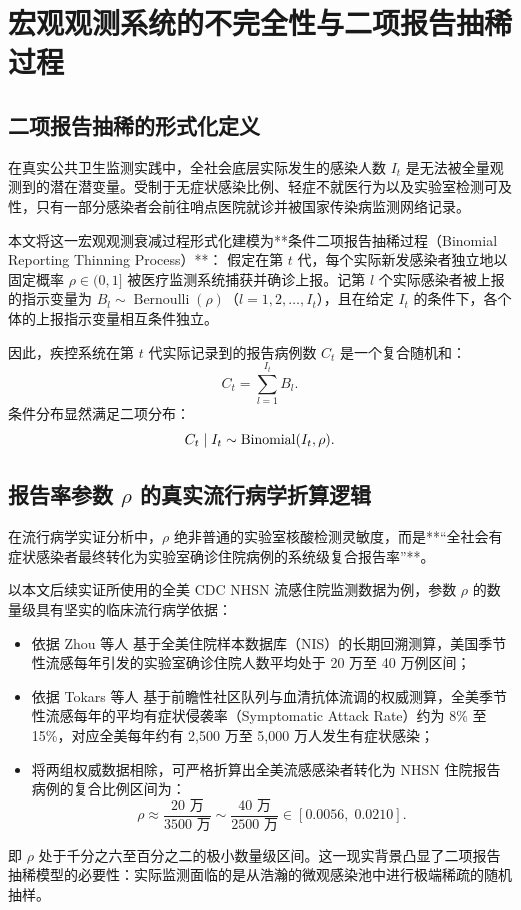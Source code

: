 \section{宏观观测系统的不完全性与二项报告抽稀过程}\label{sec:thinning}

\subsection{二项报告抽稀的形式化定义}
在真实公共卫生监测实践中，全社会底层实际发生的感染人数 $I_t$ 是无法被全量观测到的潜在潜变量。受制于无症状感染比例、轻症不就医行为以及实验室检测可及性，只有一部分感染者会前往哨点医院就诊并被国家传染病监测网络记录。

本文将这一宏观观测衰减过程形式化建模为**条件二项报告抽稀过程（Binomial Reporting Thinning Process）**：
假定在第 $t$ 代，每个实际新发感染者独立地以固定概率 $\rho \in (0, 1]$ 被医疗监测系统捕获并确诊上报。记第 $l$ 个实际感染者被上报的指示变量为 $B_l \sim \operatorname{Bernoulli}(\rho)$（$l = 1, 2, \dots, I_t$），且在给定 $I_t$ 的条件下，各个体的上报指示变量相互条件独立。

因此，疾控系统在第 $t$ 代实际记录到的报告病例数 $C_t$ 是一个复合随机和：
\begin{equation}
C_t = \sum_{l=1}^{I_t} B_l. \label{eq:binomial_thinning_sum}
\end{equation}
条件分布显然满足二项分布：
\begin{equation}
C_t \mid I_t \sim \operatorname{Binomial}(I_t, \rho).
\end{equation}

\subsection{报告率参数 $\rho$ 的真实流行病学折算逻辑}
在流行病学实证分析中，$\rho$ 绝非普通的实验室核酸检测灵敏度，而是**“全社会有症状感染者最终转化为实验室确诊住院病例的系统级复合报告率”**。

以本文后续实证所使用的全美 CDC NHSN 流感住院监测数据为例，参数 $\rho$ 的数量级具有坚实的临床流行病学依据：
\begin{itemize}
    \item 依据 Zhou 等人 \citep{zhou2012hospitalizations} 基于全美住院样本数据库（NIS）的长期回溯测算，美国季节性流感每年引发的实验室确诊住院人数平均处于 20 万至 40 万例区间；
    \item 依据 Tokars 等人 \citep{tokars2018seasonal} 基于前瞻性社区队列与血清抗体流调的权威测算，全美季节性流感每年的平均有症状侵袭率（Symptomatic Attack Rate）约为 8\% 至 15\%，对应全美每年约有 2,500 万至 5,000 万人发生有症状感染；
    \item 将两组权威数据相除，可严格折算出全美流感感染者转化为 NHSN 住院报告病例的复合比例区间为：
    \begin{equation}
    \rho \approx \frac{20\text{ 万}}{3500\text{ 万}} \sim \frac{40\text{ 万}}{2500\text{ 万}} \in [0.0056, \; 0.0210]. \label{eq:rho_range}
    \end{equation}
\end{itemize}
即 $\rho$ 处于千分之六至百分之二的极小数量级区间。这一现实背景凸显了二项报告抽稀模型的必要性：实际监测面临的是从浩瀚的微观感染池中进行极端稀疏的随机抽样。

